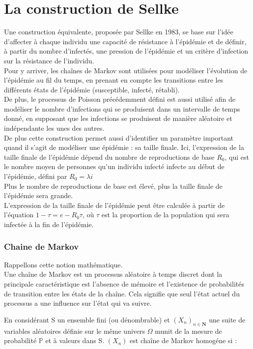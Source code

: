 \section{La construction de Sellke}

Une construction équivalente, proposée par Sellke en 1983, se base sur l’idée d’affecter à chaque individu une capacité de résistance à l’épidémie et de définir, à partir du nombre d’infectés, une pression de l’épidémie et un critère d’infection sur la résistance de l’individu. \\
Pour y arriver, les chaînes de Markov sont utilisées pour modéliser l’évolution de l’épidémie au fil du temps, en prenant en compte les transitions entre les différents états de l’épidémie (susceptible, infecté, rétabli). \\
De plus, le processus de Poisson précédemment défini est aussi utilisé afin de modéliser le nombre d’infections qui se produisent dans un intervalle de temps donné, en supposant que les infections se produisent de manière aléatoire et indépendante les unes des autres.\\

De plus cette construction permet aussi d’identifier un paramètre important quand il s’agit de modéliser une épidémie : sa taille finale. Ici, l’expression de la taille finale de l’épidémie dépend du nombre de reproductions de base $R_0$, qui est le nombre moyen de personnes qu’un individu infecté infecte au début de l’épidémie, défini par $R_0 = \lambda i$\\
Plus le nombre de reproductions de base est élevé, plus la taille finale de l’épidémie sera grande.\\
L’expression de la taille finale de l’épidémie peut être calculée à partir de l’équation $1 - \tau = e - R_0\tau$, où $\tau$ est la proportion de la population qui sera infectée à la fin de l’épidémie.


\subsubsection{Chaine de Markov}
Rappellons cette notion mathématique.\\
Une chaîne de Markov est un processus aléatoire à temps discret dont la principale caractéristique est l’absence de mémoire et l’existence de probabilités de transition entre les états de la chaîne. Cela signifie que seul l’état actuel du processus a une influence sur l’état qui va suivre.

En considérant S un ensemble fini (ou dénombrable) et $(X_n)_{n \in \boldsymbol{N}}$ une suite de variables aléatoires définie sur le même univers $\Omega$ munit de la mesure de probabilité $\mathbb{P}$ et à valeurs dans S. $(X_n)$ est chaîne de Markov homogéne si :

